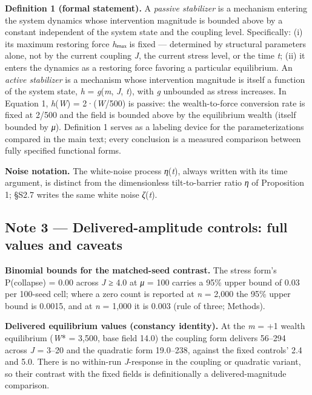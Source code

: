 \documentclass[11pt,letterpaper]{article}
\begin{document}
\textbf{Definition 1 (formal statement).} A \emph{passive stabilizer} is a mechanism entering the system dynamics whose intervention magnitude is bounded above by a constant independent of the system state and the coupling level. Specifically: (i) its maximum restoring force \emph{h}ₘₐₓ is fixed --- determined by structural parameters alone, not by the current coupling \emph{J}, the current stress level, or the time \emph{t}; (ii) it enters the dynamics as a restoring force favoring a particular equilibrium. An \emph{active stabilizer} is a mechanism whose intervention magnitude is itself a function of the system state, \emph{h} = \emph{g}(\emph{m}, \emph{J}, \emph{t}), with \emph{g} unbounded as stress increases. In Equation 1, \emph{h}(\emph{W}) = 2·(\emph{W}/500) is passive: the wealth-to-force conversion rate is fixed at 2/500 and the field is bounded above by the equilibrium wealth (itself bounded by \emph{μ}). Definition 1 serves as a labeling device for the parameterizations compared in the main text; every conclusion is a measured comparison between fully specified functional forms.

\textbf{Noise notation.} The white-noise process \emph{η}(\emph{t}), always written with its time argument, is distinct from the dimensionless tilt-to-barrier ratio \emph{η} of Proposition 1; §S2.7 writes the same white noise \emph{ζ}(\emph{t}).

\subsection{Note 3 --- Delivered-amplitude controls: full values and caveats}\label{note-3-delivered-amplitude-controls-full-values-and-caveats}

\textbf{Binomial bounds for the matched-seed contrast.} The stress form's P(collapse) = 0.00 across \emph{J} ≥ 4.0 at \emph{μ} = 100 carries a 95\% upper bound of 0.03 per 100-seed cell; where a zero count is reported at \emph{n} = 2,000 the 95\% upper bound is 0.0015, and at \emph{n} = 1,000 it is 0.003 (rule of three; Methods).

\textbf{Delivered equilibrium values (constancy identity).} At the \emph{m} = +1 wealth equilibrium (\emph{W}* = 3,500, base field 14.0) the coupling form delivers 56--294 across \emph{J} = 3--20 and the quadratic form 19.0--238, against the fixed controls' 2.4 and 5.0. There is no within-run \emph{J}-response in the coupling or quadratic variant, so their contrast with the fixed fields is definitionally a delivered-magnitude comparison.
\end{document}
